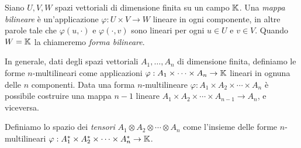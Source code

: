 \begin{definition}
	Siano $ U,V,W $ spazi vettoriali di dimensione finita su un campo $ \mathbb{K} $. Una \emph{mappa
		bilineare} è un'applicazione $ \varphi : U \times V \to
		W$ lineare in ogni componente, in altre parole tale che $ \varphi(u, \cdot) $ e $ \varphi(\cdot,v) $ sono
	lineari per ogni $ u\in U $ e $ v\in V $. Quando $ W = \mathbb{K} $ la chiameremo \emph{forma bilineare}.
\end{definition}
In generale, dati degli spazi vettoriali $ A_1, \ldots, A_{n} $ di
dimensione finita, definiamo le forme $ n $-multilineari come applicazioni $ \varphi : A_1
	\times \cdots \times A_{n} \to \mathbb{K} $ lineari in ognuna delle $ n $ componenti. Data una forma $ n
$-multilineare $ \varphi : A_1 \times A_2 \times \cdots \times A_{n} $ è possibile costruire una
mappa $ n-1 $ lineare $ A_1 \times A_2 \times \cdots \times  A_{n-1} \to A_{n} $, e viceversa.

\begin{definition}[Tensore]
	Definiamo lo spazio dei \emph{tensori} $ A_1 \otimes A_2 \otimes \cdots \otimes
		A_{n} $ come l'insieme delle forme $ n $-multilineari $ \varphi : A_1^* \times A_2^* \times
		\cdots \times A_{n}^* \to \mathbb{K}$.
\end{definition}

